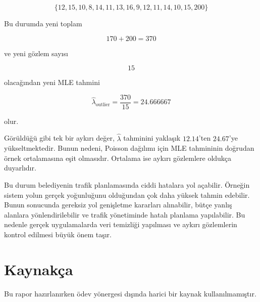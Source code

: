 \documentclass[12pt,a4paper]{article}
\begin{document}
\[
\{12,15,10,8,14,11,13,16,9,12,11,14,10,15,200\}
\]

Bu durumda yeni toplam

\[
170+200=370
\]

ve yeni gözlem sayısı

\[
15
\]

olacağından yeni MLE tahmini

\[
\hat{\lambda}_{\text{outlier}}=\frac{370}{15}=24.666667
\]

olur.

Görüldüğü gibi tek bir aykırı değer, \(\hat{\lambda}\) tahminini yaklaşık \(12.14\)'ten \(24.67\)'ye yükseltmektedir. Bunun nedeni, Poisson dağılımı için MLE tahmininin doğrudan örnek ortalamasına eşit olmasıdır. Ortalama ise aykırı gözlemlere oldukça duyarlıdır.

Bu durum belediyenin trafik planlamasında ciddi hatalara yol açabilir. Örneğin sistem yolun gerçek yoğunluğunu olduğundan çok daha yüksek tahmin edebilir. Bunun sonucunda gereksiz yol genişletme kararları alınabilir, bütçe yanlış alanlara yönlendirilebilir ve trafik yönetiminde hatalı planlama yapılabilir. Bu nedenle gerçek uygulamalarda veri temizliği yapılması ve aykırı gözlemlerin kontrol edilmesi büyük önem taşır.

\section*{Kaynakça}

Bu rapor hazırlanırken ödev yönergesi dışında harici bir kaynak kullanılmamıştır.
\end{document}
